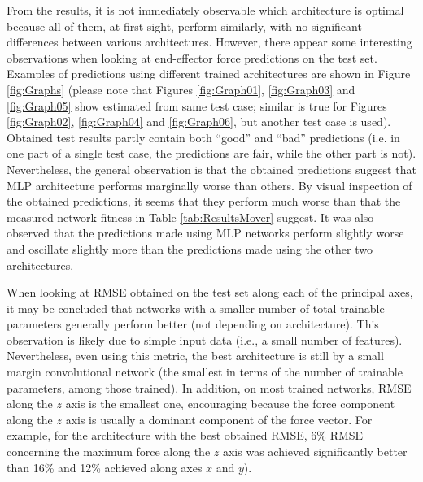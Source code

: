 From the results, it is not immediately observable which architecture is optimal because all of them, at first sight, perform similarly, with no significant differences between various architectures. However, there appear some interesting observations when looking at end-effector force predictions on the test set. Examples of predictions using different trained architectures are shown in Figure \ref{fig:Graphs} (please note that Figures \ref{fig:Graph01}, \ref{fig:Graph03} and \ref{fig:Graph05} show estimated from same test case; similar is true for Figures \ref{fig:Graph02}, \ref{fig:Graph04} and \ref{fig:Graph06}, but another test case is used). Obtained test results partly contain both ``good'' and ``bad'' predictions (i.e. in one part of a single test case, the predictions are fair, while the other part is not). Nevertheless, the general observation is that the obtained predictions suggest that MLP architecture performs marginally worse than others. By visual inspection of the obtained predictions, it seems that they perform much worse than that the measured network fitness in Table \ref{tab:ResultsMover} suggest. It was also observed that the predictions made using MLP networks perform slightly worse and oscillate slightly more than the predictions made using the other two architectures.

When looking at RMSE obtained on the test set along each of the principal axes, it may be concluded that networks with a smaller number of total trainable parameters generally perform better (not depending on architecture). This observation is likely due to simple input data (i.e., a small number of features). Nevertheless, even using this metric, the best architecture is still by a small margin convolutional network (the smallest in terms of the number of trainable parameters, among those trained). In addition, on most trained networks, RMSE along the $z$ axis is the smallest one, encouraging because the force component along the $z$ axis is usually a dominant component of the force vector. For example, for the architecture with the best obtained RMSE, 6\% RMSE concerning the maximum force along the $z$ axis was achieved significantly better than 16\% and 12\% achieved along axes $x$ and $y$).

